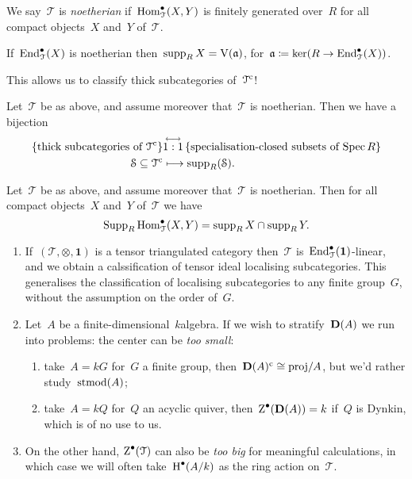 \documentclass[10pt,a4paper]{article}
\begin{document}
We say~$\mathcal{T}$ is \emph{noetherian} if~$\operatorname{Hom}_{\mathcal{T}}^\bullet(X,Y)$ is finitely generated over~$R$ for all compact objects~$X$ and~$Y$ of~$\mathcal{T}$.
\begin{lemma}
  If~$\operatorname{End}_{\mathcal{T}}^\bullet(X)$ is noetherian then~$\operatorname{supp}_R X=\operatorname{V}(\mathfrak{a})$, for~$\mathfrak{a}\coloneqq\ker(R\to\operatorname{End}_{\mathcal{T}}^\bullet(X))$.
\end{lemma}
This allows us to classify thick subcategories of~$\mathcal{T}^{\mathrm{c}}$!
\begin{theorem}
  Let~$\mathcal{T}$ be as above, and assume moreover that~$\mathcal{T}$ is noetherian. Then we have a bijection
  \begin{equation}
    \begin{aligned}
      \left\{ \text{thick subcategories of~$\mathcal{T}^{\mathrm{c}}$} \right\} & \overset{\longleftrightarrow}{1:1}\left\{ \text{specialisation-closed subsets of $\operatorname{Spec} R$} \right\} \\
      \mathcal{S}\subseteq\mathcal{T}^{\mathrm{c}} & \longmapsto\operatorname{supp}_R(\mathcal{S}).
    \end{aligned}
  \end{equation}
\end{theorem}
\begin{corollary}
  Let~$\mathcal{T}$ be as above, and assume moreover that~$\mathcal{T}$ is noetherian. Then for all compact objects~$X$ and~$Y$ of~$\mathcal{T}$ we have
  \begin{equation}
    \operatorname{Supp}_R\operatorname{Hom}_{\mathcal{T}}^\bullet(X,Y)=\operatorname{supp}_R X\cap\operatorname{supp}_R Y.
  \end{equation}
\end{corollary}

\begin{example}
  \begin{enumerate}
    \item If~$(\mathcal{T},\otimes,\mathbf{1})$ is a tensor triangulated category then~$\mathcal{T}$ is~$\operatorname{End}_{\mathcal{T}}^\bullet(\mathbf{1})$-linear, and we obtain a calssification of tensor ideal localising subcategories. This generalises the classification of localising subcategories to any finite group~$G$, without the assumption on the order of~$G$.
    \item Let~$A$ be a finite-dimensional~$k$\dash algebra. If we wish to stratify~$\mathbf{D}(A)$ we run into problems: the center can be \emph{too small}:
      \begin{enumerate}
        \item take~$A=kG$ for~$G$ a finite group, then~$\mathbf{D}(A)^{\mathrm{c}}\cong\mathrm{proj}/A$, but we'd rather study~$\operatorname{stmod}(A)$;
        \item take~$A=kQ$ for~$Q$ an acyclic quiver, then~$\operatorname{Z}^\bullet(\mathbf{D}(A))=k$ if~$Q$ is Dynkin, which is of no use to us.
      \end{enumerate}
    \item On the other hand, $\operatorname{Z}^\bullet(\mathcal{T})$ can also be \emph{too big} for meaningful calculations, in which case we will often take~$\operatorname{H}^\bullet(A/k)$ as the ring action on~$\mathcal{T}$.
  \end{enumerate}
\end{example}
\end{document}
